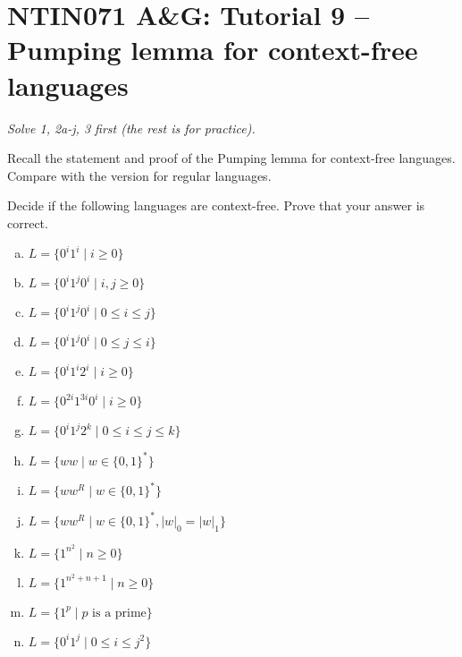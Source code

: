 \documentclass[a4paper,12pt]{amsart}
\begin{document}
\thispagestyle{empty}

\section*{NTIN071 A\&G: Tutorial 9 -- Pumping lemma for context-free languages}


\medskip

\noindent\emph{Solve 1, 2a-j, 3 first (the rest is for practice).}

\medskip


\medskip\begin{problem}

    Recall the statement and proof of the Pumping lemma for context-free languages. Compare with the version for regular languages.

\end{problem}


\medskip\begin{problem}

    Decide if the following languages are context-free. Prove that your answer is correct.
    
    \begin{multicols}{2}
    
        \begin{enumerate}[(a)]
            \setlength\itemsep{1em}
            \item $L=\{0^i1^i\mid i\geq 0\}$
            \item $L=\{0^i1^j0^i\mid i,j\geq 0\}$
            \item $L=\{0^i1^j0^i\mid 0\leq i\leq j\}$
            \item $L=\{0^i1^j0^i\mid 0\leq j\leq i\}$
            \item $L=\{0^i1^i2^i\mid i\geq 0\}$
            \item $L=\{0^{2i}1^{3i}0^i\mid i\geq 0\}$
            \item $L=\{0^i1^j2^k\mid 0\leq i\leq j\leq k\}$
            \item $L=\{ww\mid w\in \{0,1\}^*\}$
            \item $L=\{ww^R\mid w\in \{0,1\}^*\}$
            \item $L=\{ww^R\mid w\in \{0,1\}^*, |w|_0=|w|_1\}$
            \item $L=\{1^{n^2}\mid n\geq 0\}$
            \item $L=\{1^{n^2+n+1}\mid n\geq 0\}$
            \item $L=\{1^p\mid p \text{ is a prime}\}$
            \item $L=\{0^i1^{j}\mid 0\leq i\leq j^2\}$
        \end{enumerate}
    
    \end{multicols}

\end{problem}
\end{document}

